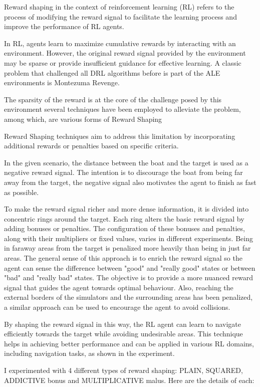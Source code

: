 \begin{textblock}
Reward shaping in the context of reinforcement learning (RL) refers to the process of modifying the reward signal to facilitate the learning process and improve the performance of RL agents. 

In RL, agents learn to maximize cumulative rewards by interacting with an environment. However, the original reward signal provided by the environment may be sparse or provide insufficient guidance for effective learning. A classic problem that challenged all DRL algorithms before is part of the ALE environments is Montezuma Revenge.

The sparsity of the reward is at the core of the challenge posed by this environment several techniques have been employed to alleviate the problem, among which, are various forms of Reward Shaping \cite{montezumasrevenge2018}

Reward Shaping techniques aim to address this limitation by incorporating additional rewards or penalties based on specific criteria.

In the given scenario, the distance between the boat and the target is used as a negative reward signal. The intention is to discourage the boat from being far away from the target, the negative signal also motivates the agent to finish as fast as possible.

To make the reward signal richer and more dense information, it is divided into concentric rings around the target. Each ring alters the basic reward signal by adding bonuses or penalties. The configuration of these bonuses and penalties, along with their multipliers or fixed values, varies in different experiments. Being in faraway areas from the target is penalized more heavily than being in just far areas. The general sense of this approach is to enrich the reward signal so the agent can sense the difference between "good" and "really good" states or between "bad" and "really bad" states. The objective is to provide a more nuanced reward signal that guides the agent towards optimal behaviour.
Also, reaching the external borders of the simulators and the surrounding areas has been penalized, a similar approach can be used to encourage the agent to avoid collisions.

By shaping the reward signal in this way, the RL agent can learn to navigate efficiently towards the target while avoiding undesirable areas. This technique helps in achieving better performance and can be applied in various RL domains, including navigation tasks, as shown in the experiment.

I experimented with 4 different types of reward shaping: PLAIN, SQUARED, ADDICTIVE bonus and MULTIPLICATIVE malus. Here are the details of each:
\end{textblock}

